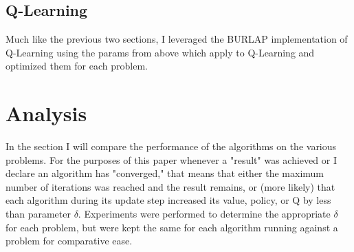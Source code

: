 \documentclass[11pt]{article}
\begin{document}
    \subsection{Q-Learning}
    Much like the previous two sections, I leveraged the BURLAP implementation of Q-Learning using the params from above
    which apply to Q-Learning and optimized them for each problem.


    \section{Analysis}
    In the section I will compare the performance of the algorithms on the various problems.
    For the purposes of this paper whenever a "result" was achieved or I declare an algorithm has "converged," that means
    that either the maximum number of iterations was reached and the result remains, or (more likely) that each algorithm
    during its update step increased its value, policy, or Q by less than parameter $\delta$.
    Experiments were performed to determine the appropriate $\delta$ for each problem, but were kept the same for each
    algorithm running against a problem for comparative ease.
\end{document}
